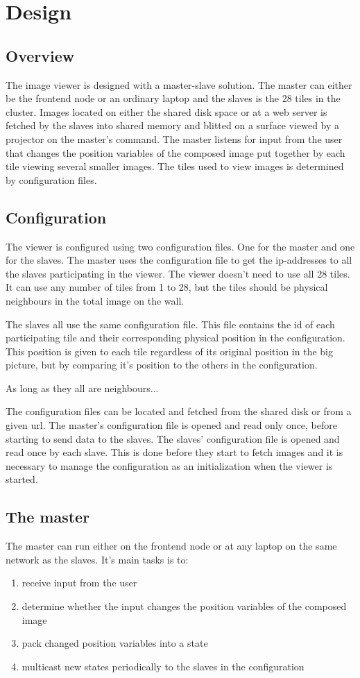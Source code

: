 \documentclass[12pt, a4paper, oneside]{article}
\begin{document}
\newpage
\section{Design}
\subsection{Overview}
The image viewer is designed with a master-slave solution. The master can either be the frontend node or an ordinary laptop and the slaves is the 28 tiles in the cluster. Images located on either the shared disk space or at a web server is fetched by the slaves into shared memory and blitted on a surface viewed by a projector on the master's command. The master listens for input from the user that changes the position variables of the composed image put together by each tile viewing several smaller images. The tiles used to view images is determined by configuration files.


\subsection{Configuration}
The viewer is configured using two configuration files. One for the master and one for the slaves. The master uses the configuration file to get the ip-addresses to all the slaves participating in the viewer. The viewer doesn't need to use all 28 tiles. It can use any number of tiles from 1 to 28, but the tiles should be physical neighbours in the total image on the wall. 

The slaves all use the same configuration file. This file contains the id of each participating tile and their corresponding physical position in the configuration. This position is given to each tile regardless of its original position in the big picture, but by comparing it's position to the others in the configuration. 

As long as they all are neighbours...

The configuration files can be located and fetched from the shared disk or from a given url. The master's configuration file is opened and read only once, before starting to send data to the slaves. The slaves' configuration file is opened and read once by each slave. This is done before they start to fetch images and it is necessary to manage the configuration as an initialization when the viewer is started.

\subsection{The master}
The master can run either on the frontend node or at any laptop on the same network as the slaves. It's main tasks is to:
\begin{enumerate}
\item receive input from the user
\item determine whether the input changes the position variables of the composed image
\item pack changed position variables into a state
\item multicast new states periodically to the slaves in the configuration
\end{enumerate}
\end{document}
